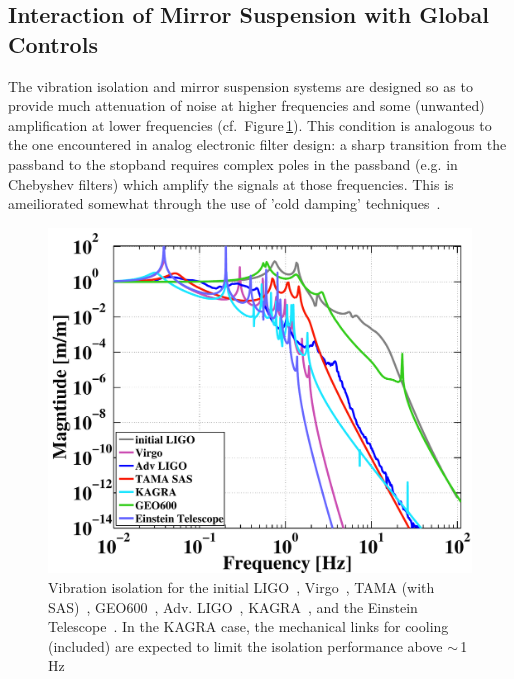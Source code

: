 \subsection{Interaction of Mirror Suspension with Global Controls}
The vibration isolation and mirror suspension systems are designed so as to
provide much attenuation of noise at higher frequencies and some (unwanted) amplification
at lower frequencies (cf.~Figure\,\ref{fig:SeismicTFs}). This condition is analogous to the
one encountered in analog electronic filter design:  a sharp transition from
the passband to the stopband requires complex poles in the passband (e.g.
in Chebyshev filters) which amplify the signals at those frequencies. This
is ameiliorated somewhat through the use of 'cold damping'
techniques~\cite{Kuroda:1982vf, Forward:1979ks, Shapiro:2015di}.


\begin{figure}[h]
\centering
\includegraphics[width=\columnwidth]{Figures/SeismicIsolations.pdf}
\caption{Vibration isolation for the initial LIGO~\cite{ponslet:432, Giaime:1996},
        Virgo~\cite{Stefano:2001, Virgo:SA2010, Accadia:2011jh},
        TAMA (with SAS)~\cite{Szabi:TAMASAS},
        GEO600~\cite{Hartmut:PhD, Ken:GEOseismic, plissi:3055},
        Adv. LIGO~\cite{aLIGO:Seismic2002},
        KAGRA~\cite{Somiya:2011tb}, and the
        Einstein Telescope~\cite{ET2011}. In the KAGRA case,
      the mechanical links for cooling (included) are expected to limit the
      isolation performance above $\sim$\,1\,Hz~\cite{Takahashi:email}}
\label{fig:SeismicTFs}
\end{figure}


